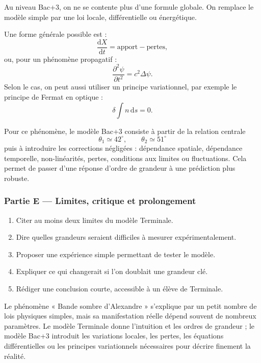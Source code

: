 \documentclass[11pt,a4paper]{article}
\begin{document}
\begin{approfondissementbox}
Au niveau Bac+3, on ne se contente plus d'une formule globale. On remplace le modèle simple par une loi locale, différentielle ou énergétique.

Une forme générale possible est :
\[
\frac{\mathrm d X}{\mathrm dt}=\text{apport}-\text{pertes},
\]
ou, pour un phénomène propagatif :
\[
\frac{\partial^2 \psi}{\partial t^2}=c^2\Delta\psi.
\]
Selon le cas, on peut aussi utiliser un principe variationnel, par exemple le principe de Fermat en optique :
\[
\delta \int n\,\mathrm ds=0.
\]

Pour ce phénomène, le modèle Bac+3 consiste à partir de la relation centrale
\[
\theta_1\simeq42^\circ,\qquad \theta_2\simeq51^\circ
\]
puis à introduire les corrections négligées : dépendance spatiale, dépendance temporelle, non-linéarités, pertes, conditions aux limites ou fluctuations. Cela permet de passer d'une réponse d'ordre de grandeur à une prédiction plus robuste.
\end{approfondissementbox}

\subsubsection*{Partie E — Limites, critique et prolongement}

\begin{enumerate}
  \item Citer au moins deux limites du modèle Terminale.
  \item Dire quelles grandeurs seraient difficiles à mesurer expérimentalement.
  \item Proposer une expérience simple permettant de tester le modèle.
  \item Expliquer ce qui changerait si l'on doublait une grandeur clé.
  \item Rédiger une conclusion courte, accessible à un élève de Terminale.
\end{enumerate}

\begin{corrigebox}
Le phénomène « Bande sombre d'Alexandre » s'explique par un petit nombre de lois physiques simples, mais sa manifestation réelle dépend souvent de nombreux paramètres. Le modèle Terminale donne l'intuition et les ordres de grandeur ; le modèle Bac+3 introduit les variations locales, les pertes, les équations différentielles ou les principes variationnels nécessaires pour décrire finement la réalité.
\end{corrigebox}
\end{document}
